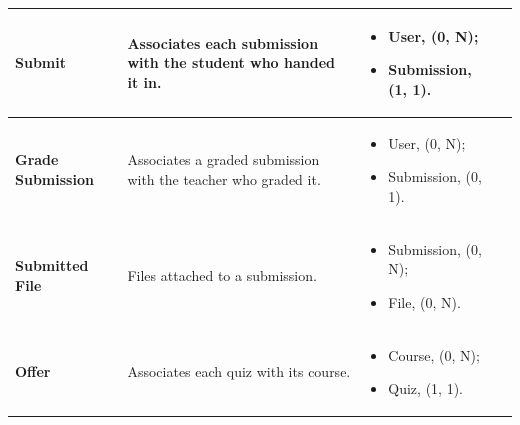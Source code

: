 {\begin{longtable}{|p{}|p{}|p{}|p{}|}
    \\ \hline

    \textbf{Submit} & Associates each submission with the student who handed it in. &
    \begin{itemize}[leftmargin=*,nosep,before=\vspace{-\baselineskip}\leavevmode,after=\vspace{-\baselineskip}]
        \item User, (0, N);
        \item Submission, (1, 1).
    \end{itemize}
    &
    
    \\ \hline

    \textbf{Grade Submission} & Associates a graded submission with the teacher who graded it. &
    \begin{itemize}[leftmargin=*,nosep,before=\vspace{-\baselineskip}\leavevmode,after=\vspace{-\baselineskip}]
        \item User, (0, N);
        \item Submission, (0, 1).
    \end{itemize}
    &
    
    \\ \hline

    \textbf{Submitted File} & Files attached to a submission. &
    \begin{itemize}[leftmargin=*,nosep,before=\vspace{-\baselineskip}\leavevmode,after=\vspace{-\baselineskip}]
        \item Submission, (0, N);
        \item File, (0, N).
    \end{itemize}
    &
    
    \\ \hline

    \textbf{Offer} & Associates each quiz with its course. &
    \begin{itemize}[leftmargin=*,nosep,before=\vspace{-\baselineskip}\leavevmode,after=\vspace{-\baselineskip}]
        \item Course, (0, N);
        \item Quiz, (1, 1).
    \end{itemize}
    &
    

\end{longtable}}
